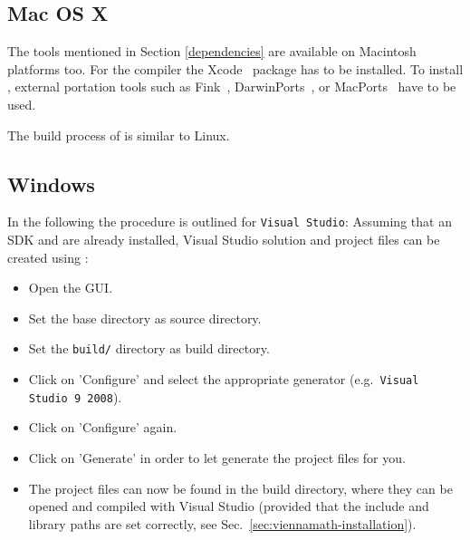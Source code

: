 
\subsection{Mac OS X}
\label{apple}
The tools mentioned in Section \ref{dependencies} are available on 
Macintosh platforms too. 
For the {\GCC} compiler the Xcode~\cite{xcode} package has to be installed.
To install {\CMake}, external portation tools such as
Fink~\cite{fink}, DarwinPorts~\cite{darwinports}, 
or MacPorts~\cite{macports} have to be used. 

The build process of {\ViennaMath} is similar to Linux.

\subsection{Windows}
In the following the procedure is outlined for \texttt{Visual Studio}: Assuming
that an {\OpenCL} SDK and {\CMake} are already installed, Visual Studio solution
and project files can be created using {\CMake}:
\begin{itemize}
\item Open the {\CMake} GUI.
\item Set the {\ViennaMath} base directory as source directory.
\item Set the \texttt{build/} directory as build directory.
\item Click on 'Configure' and select the appropriate generator
(e.g.~\texttt{Visual Studio 9 2008}).
\item Click on 'Configure' again.
\item Click on 'Generate' in order to let {\CMake} generate the project files for you.
\item The project files can now be found in the {\ViennaMath} build directory,
where they can be opened and compiled with Visual Studio (provided that the
include and library paths are set correctly, see
Sec.~\ref{sec:viennamath-installation}).
\end{itemize}

























